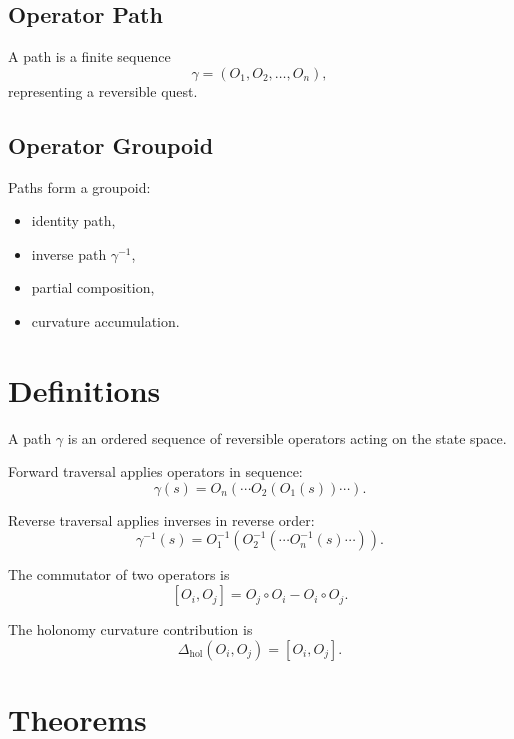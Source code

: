 \subsection{Operator Path}
A path is a finite sequence
\[
\gamma = (O_1, O_2, \ldots, O_n),
\]
representing a reversible quest.

\subsection{Operator Groupoid}
Paths form a groupoid:
\begin{itemize}
    \item identity path,
    \item inverse path $\gamma^{-1}$,
    \item partial composition,
    \item curvature accumulation.
\end{itemize}

\section{Definitions}

\begin{definition}
A path $\gamma$ is an ordered sequence of reversible operators acting on
the state space.
\end{definition}

\begin{definition}
Forward traversal applies operators in sequence:
\[
\gamma(s) = O_n(\cdots O_2(O_1(s))\cdots).
\]
\end{definition}

\begin{definition}
Reverse traversal applies inverses in reverse order:
\[
\gamma^{-1}(s) = O_1^{-1}(O_2^{-1}(\cdots O_n^{-1}(s)\cdots)).
\]
\end{definition}

\begin{definition}[Commutator]
The commutator of two operators is
\[
[O_i, O_j] = O_j \circ O_i - O_i \circ O_j.
\]
\end{definition}

\begin{definition}
The holonomy curvature contribution is
\[
\Delta_{\mathrm{hol}}(O_i, O_j) = [O_i, O_j].
\]
\end{definition}

\section{Theorems}

